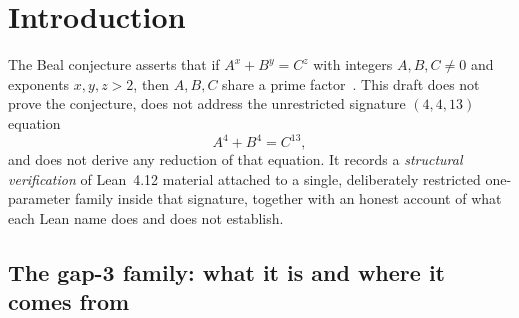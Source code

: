 \section{Introduction}\label{sec:intro}

The Beal conjecture asserts that if $A^x+B^y=C^z$ with integers
$A,B,C\neq 0$ and exponents $x,y,z>2$, then $A,B,C$ share a prime
factor~\cite{mauldin1997beal}. This draft does not prove the
conjecture, does not address the unrestricted signature $(4,4,13)$
equation
\[
  A^4+B^4=C^{13},
\]
and does not derive any reduction of that equation. It records a
\emph{structural verification} of Lean~4.12 material attached to a
single, deliberately restricted one-parameter family inside that
signature, together with an honest account of what each Lean name
does and does not establish.

\subsection*{The gap-3 family: what it is and where it comes from}

